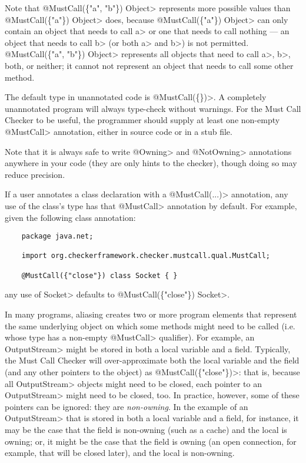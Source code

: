 Note that \<@MustCall(\{"a", "b"\}) Object> represents more possible values than
\<@MustCall(\{"a"\}) Object> does, because \<@MustCall(\{"a"\}) Object> can only
contain an object that needs to call \<a> or one that needs to call nothing --- an
object that needs to call \<b> (or both \<a> and \<b>) is not permitted.
\<@MustCall(\{"a", "b"\}) Object> represents all objects that need to
call \<a>, \<b>, both, or neither; it cannot not represent an object that needs
to call some other method.

The default type in unannotated code is \<@MustCall(\{\})>.
A completely unannotated program will always type-check without warnings.
For the Must Call Checker to be useful, the programmer should supply at least one non-empty
\<@MustCall> annotation, either in source code or in a stub file.

Note that it is always safe to write \<@Owning> and \<@NotOwning> annotations anywhere in your
code (they are only hints to the checker), though doing so may reduce precision.


If a user annotates a class declaration with a \<@MustCall(...)> annotation, any use of the class's
type has that \<@MustCall> annotation by default. For example, given the following class annotation:
\begin{Verbatim}
    package java.net;

    import org.checkerframework.checker.mustcall.qual.MustCall;

    @MustCall({"close"}) class Socket { }
\end{Verbatim}
any use of \<Socket> defaults to \<@MustCall(\{"close"\}) Socket>.



In many programs, aliasing creates two or more program elements that represent the same
underlying object on which some methods might need to be called (i.e. whose type has a non-empty
\<@MustCall> qualifier). For example, an \<OutputStream> might be stored in both
a local variable and a field. Typically, the Must Call Checker will over-approximate both
the local variable and the field (and any other pointers to the object) as \<@MustCall(\{"close"\})>:
that is, because all \<OutputStream> objects might need to be closed, each pointer to an
\<OutputStream> might need to be closed, too. In practice, however, some of these pointers can be
ignored: they are \emph{non-owning}. In the example of an \<OutputStream> that is stored in both
a local variable and a field, for instance, it may be the case that the field is non-owning (such
as a cache) and the local is owning; or, it might be the case that the field is owning (an open connection,
for example, that will be closed later), and the local is non-owning.

